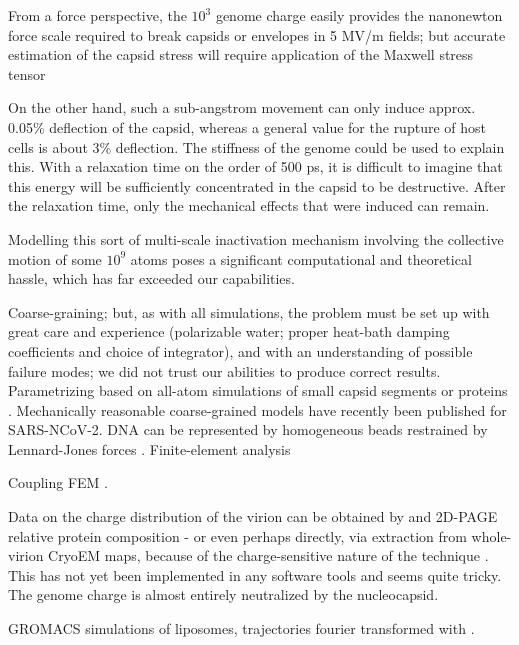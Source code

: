 \documentclass[paper.tex]{subfiles}
\begin{document}
\begin{multicols}{1}
From a force perspective, the $10^3$ genome charge easily provides the nanonewton force scale required\cite{Bacteriophage2004} to break capsids or envelopes in 5 MV/m fields; but accurate estimation of the capsid stress will require application of the Maxwell stress tensor \cite{Electrostatic2013}\cite{Deformation1991}

On the other hand, such a sub-angstrom movement can only induce approx. 0.05\% deflection of the capsid, whereas a general value for the rupture of host cells is about 3\% deflection\cite{Electromechanical1989}. The stiffness of the genome could be used to explain this. With a relaxation time on the order of 500 ps, it is difficult to imagine that this energy will be sufficiently concentrated in the capsid to be destructive. After the relaxation time, only the mechanical effects that were induced can remain.

Modelling this sort of multi-scale inactivation mechanism involving the collective motion of some $10^9$ atoms poses a significant computational and theoretical hassle, which has far exceeded our capabilities. 

Coarse-graining; but, as with all simulations, the problem must be set up with great care and experience (polarizable water; proper heat-bath damping coefficients and choice of integrator)\cite{Membrane2016}, and with an understanding of possible failure modes; we did not trust our abilities to produce correct results. Parametrizing based on all-atom simulations of small capsid segments or proteins \cite{Elucidating2009}. Mechanically reasonable coarse-grained models have recently been published for SARS-NCoV-2\cite{Multiscale2020}. DNA can be represented by homogeneous beads restrained by Lennard-Jones forces \cite{Communication2013}. Finite-element analysis \cite{Finite2008} 

Coupling FEM \cite{Electrostatic2020a}. 



Data on the charge distribution of the virion can be obtained by and 2D-PAGE relative protein composition - or even perhaps directly, via extraction from whole-virion CryoEM maps, because of the charge-sensitive nature of the technique \cite{Identification2018}\cite{Electrostatic2020}. This has not yet been implemented in any software tools and seems quite tricky. The genome charge is almost entirely neutralized by the nucleocapsid. 

GROMACS simulations of liposomes, trajectories fourier transformed with \cite{TRAVIS2011}.


\end{multicols}
\end{document}

